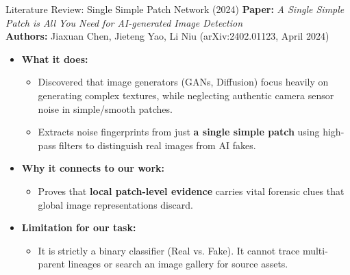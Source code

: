 \documentclass[xcolor=table]{beamer}
\begin{document}
\begin{frame}{Literature Review: Single Simple Patch Network (2024)}
  \textbf{Paper:} \textit{A Single Simple Patch is All You Need for AI-generated Image Detection} \\
  \textbf{Authors:} Jiaxuan Chen, Jieteng Yao, Li Niu (arXiv:2402.01123, April 2024)
  \vspace{0.2cm}
  \begin{itemize}
    \item \textbf{What it does:} 
    \begin{itemize}
      \item Discovered that image generators (GANs, Diffusion) focus heavily on generating complex textures, while neglecting authentic camera sensor noise in simple/smooth patches.
      \item Extracts noise fingerprints from just \textbf{a single simple patch} using high-pass filters to distinguish real images from AI fakes.
    \end{itemize}
    \item \textbf{Why it connects to our work:} 
    \begin{itemize}
      \item Proves that \textbf{local patch-level evidence} carries vital forensic clues that global image representations discard.
    \end{itemize}
    \item \textbf{Limitation for our task:} 
    \begin{itemize}
      \item It is strictly a binary classifier (Real vs. Fake). It cannot trace multi-parent lineages or search an image gallery for source assets.
    \end{itemize}
  \end{itemize}
\end{frame}
\end{document}
